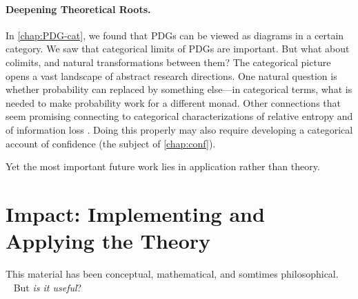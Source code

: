 \paragraph{Deepening Theoretical Roots.}
% 
In \cref{chap:PDG-cat}, we found that PDGs can be viewed as diagrams in a certain category. 
We saw that categorical limits of PDGs are important. But what about colimits, and natural transformations between them? 
The categorical picture opens a vast landscape of abstract research directions.
One natural question is whether probability can replaced by something else---in categorical terms, what is needed to make probability work for a different monad.
%
Other connections that seem promising connecting to categorical characterizations of relative entropy \citep{baez2014bayesiancharacterizationrelativeentropy} 
and of information loss \citep[Theorem 12.4.9]{leinster2021entropy}.
Doing this properly may also require developing a categorical account of confidence (the subject of \cref{chap:conf}). 

Yet the most important future work lies in application rather than theory.

\section{Impact: Implementing and Applying the Theory}

This material has been conceptual, mathematical, and somtimes philosophical.
\\~\hfil
But \emph{is it useful}?
\hfil\par


